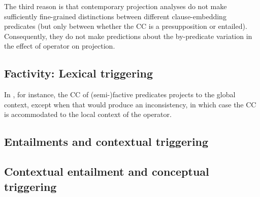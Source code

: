 \documentclass[a4paper,12pt,twoside]{article}
\begin{document}
	The third reason is that contemporary projection analyses do not make sufficiently fine-grained distinctions between different clause-embedding predicates (but only between whether the CC is a presupposition or entailed). Consequently, they do not make predictions about the by-predicate variation in the effect of operator on projection.


	\subsection{Factivity: Lexical triggering}

		In \citet{heim_projection_1983}, for instance, the CC of (semi-)factive predicates projects to the global context, except when that would produce an inconsistency, in which case the CC is accommodated to the local context of the operator.

	\subsection{Entailments and contextual triggering}

	\subsection{Contextual entailment and conceptual triggering}
\end{document}
